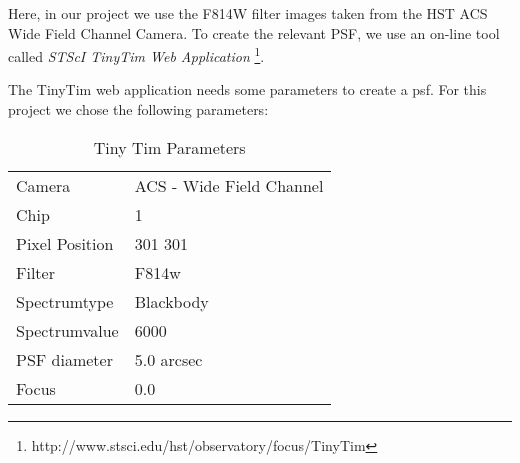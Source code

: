 Here, in our project we use the F814W filter images taken from the HST ACS Wide Field Channel Camera.
To create the relevant PSF, we use an on-line tool called  \textit{STScI TinyTim Web Application} 
\footnote{http://www.stsci.edu/hst/observatory/focus/TinyTim}.

The TinyTim web application needs some parameters to create a psf.
For this project we chose the following parameters:

\begin{table}[!h]
\centering
\caption{Tiny Tim Parameters}
\label{tiny-tim}
\begin{tabular}{ll}
Camera         & ACS - Wide Field Channel \\
Chip           & 1                        \\
Pixel Position & 301 301                  \\
Filter         & F814w                    \\
Spectrumtype   & Blackbody                \\
Spectrumvalue  & 6000                     \\
PSF diameter   & 5.0 arcsec               \\
Focus          & 0.0                     
\end{tabular}
\end{table}

